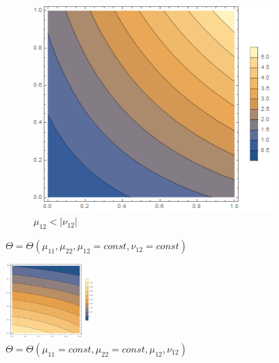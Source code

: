 \documentclass[12pt,a4]{article}
\begin{document}
\begin{figure}[!ht]
\begin{subfigure}[b]{0.3\textwidth}
	\end{subfigure}
	\hfill
	\begin{subfigure}[b]{0.3\textwidth}
		\centering
		\includegraphics[width=\textwidth]{Joonised/ThetaMu11Mu22III}
		\caption{$ \mu_{12} < | \nu_{12}| $}
	\end{subfigure}
	\caption{$ \Theta = \Theta (\mu_{11}, \mu_{22}, \mu_{12} = const, \nu_{12} = const) $}
\end{figure}
\begin{figure}[!ht]
	\centering
	\includegraphics[width=0.3\textwidth]{Joonised/ThetaMu12Nu12}
	\caption{$ \Theta = \Theta (\mu_{11} = const, \mu_{22} = const, \mu_{12}, \nu_{12}) $}
\end{figure}
\end{document}
